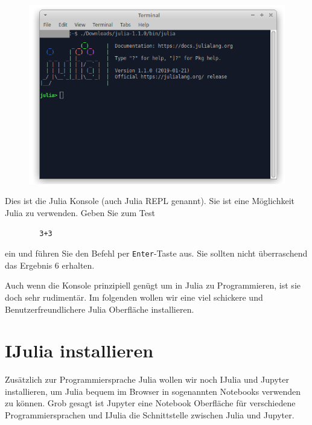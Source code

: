 \documentclass[11pt, a4paper]{scrartcl}
\begin{document}
	\begin{figure}[h!]
	\centering
	\includegraphics[width=\textwidth]{imgs/julia_REPL.png}
	\end{figure}

	Dies ist die Julia Konsole (auch Julia REPL genannt). Sie ist eine Möglichkeit Julia zu verwenden. Geben Sie zum Test
	
	\begin{lstlisting}
		3+3
	\end{lstlisting}
	
	ein und führen Sie den Befehl per \texttt{Enter}-Taste aus. Sie sollten nicht überraschend das Ergebnis 6 erhalten.
	
	\vspace{1cm}
	
	Auch wenn die Konsole prinzipiell genügt um in Julia zu Programmieren, ist sie doch sehr rudimentär. Im folgenden wollen wir eine viel schickere und Benutzerfreundlichere Julia Oberfläche installieren.
	
	
	
	
	
	
	
	
	
	
	
	\newpage
	\section{IJulia installieren}
	
	Zusätzlich zur Programmiersprache Julia wollen wir noch IJulia und Jupyter installieren, um Julia bequem im Browser in sogenannten Notebooks verwenden zu können. Grob gesagt ist Jupyter eine Notebook Oberfläche für verschiedene Programmiersprachen und IJulia die Schnittstelle zwischen Julia und Jupyter. 
	
\end{document}
